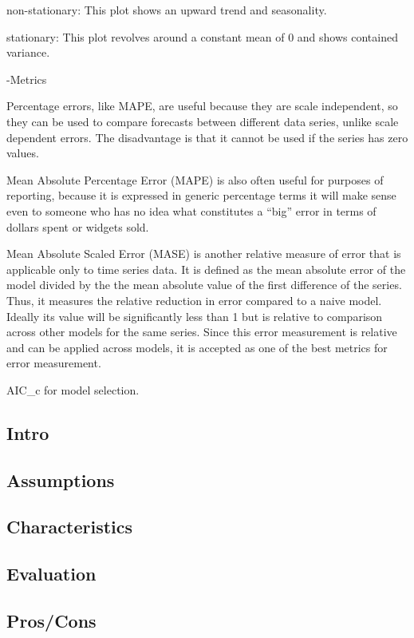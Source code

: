 \documentclass[]{book}
\begin{document}
non-stationary: This plot shows an upward trend and seasonality.

stationary: This plot revolves around a constant mean of 0 and shows
contained variance.

-Metrics

Percentage errors, like MAPE, are useful because they are scale
independent, so they can be used to compare forecasts between different
data series, unlike scale dependent errors. The disadvantage is that it
cannot be used if the series has zero values.

Mean Absolute Percentage Error (MAPE) is also often useful for purposes
of reporting, because it is expressed in generic percentage terms it
will make sense even to someone who has no idea what constitutes a
``big'' error in terms of dollars spent or widgets sold.

Mean Absolute Scaled Error (MASE) is another relative measure of error
that is applicable only to time series data. It is defined as the mean
absolute error of the model divided by the the mean absolute value of
the first difference of the series. Thus, it measures the relative
reduction in error compared to a naive model. Ideally its value will be
significantly less than 1 but is relative to comparison across other
models for the same series. Since this error measurement is relative and
can be applied across models, it is accepted as one of the best metrics
for error measurement.

AIC\_c for model selection.

\subsection{Intro}\label{intro-16}

\subsection{Assumptions}\label{assumptions-15}

\subsection{Characteristics}\label{characteristics-12}

\subsection{Evaluation}\label{evaluation-15}

\subsection{Pros/Cons}\label{proscons-16}
\end{document}
